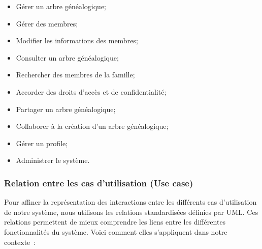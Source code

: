 \begin{itemize}
  \item Gérer un arbre généalogique;

  \item Gérer des membres;

  \item Modifier les informations des membres;

  \item Consulter un arbre généalogique;

  \item Rechercher des membres de la famille;

  \item Accorder des droits d'accès et de confidentialité;

  \item Partager un arbre généalogique;

  \item Collaborer à la création d'un arbre généalogique;

  \item Gérer un profile;

  \item Administrer le système.

\end{itemize}


\subsubsection{Relation entre les cas d'utilisation (Use case)}
Pour affiner la représentation des interactions entre les différents cas
d’utilisation de notre système, nous utilisons les relations standardisées
définies par UML. Ces relations permettent de mieux comprendre les liens entre
les différentes fonctionnalités du système. Voici comment elles s’appliquent
dans notre contexte :


